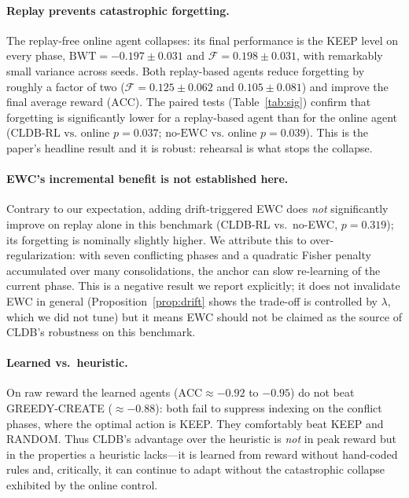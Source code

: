 \paragraph{Replay prevents catastrophic forgetting.}
The replay-free online agent collapses: its final performance is the KEEP level
on every phase, \mbox{\(\mathrm{BWT}=-0.197\pm0.031\)} and
\mbox{\(\mathcal{F}=0.198\pm0.031\)}, with remarkably small variance across seeds.
Both replay-based agents reduce forgetting by roughly a factor of two
(\(\mathcal{F}=0.125\pm0.062\) and \(0.105\pm0.081\)) and improve the final
average reward (\(\mathrm{ACC}\)). The paired tests (Table~\ref{tab:sig}) confirm
that forgetting is significantly lower for a replay-based agent than for the
online agent (\(\text{CLDB-RL vs. online } p=0.037\);
\(\text{no-EWC vs. online } p=0.039\)). This is the paper's headline result and
it is robust: rehearsal is what stops the collapse.

\paragraph{EWC's incremental benefit is not established here.}
Contrary to our expectation, adding drift-triggered EWC does \emph{not}
significantly improve on replay alone in this benchmark (CLDB-RL vs.\ no-EWC,
\(p=0.319\)); its forgetting is nominally slightly higher. We attribute this to
over-regularization: with seven conflicting phases and a quadratic Fisher
penalty accumulated over many consolidations, the anchor can slow re-learning of
the current phase. This is a negative result we report explicitly; it does not
invalidate EWC in general (Proposition~\ref{prop:drift} shows the trade-off is
controlled by \(\lambda\), which we did not tune) but it means EWC should not be
claimed as the source of CLDB's robustness on this benchmark.

\paragraph{Learned vs.\ heuristic.}
On raw reward the learned agents (\(\mathrm{ACC}\approx-0.92\) to \(-0.95\)) do not
beat GREEDY-CREATE (\(\approx-0.88\)): both fail to suppress indexing on the
conflict phases, where the optimal action is KEEP. They comfortably beat KEEP and
RANDOM. Thus CLDB's advantage over the heuristic is \emph{not} in peak reward but
in the properties a heuristic lacks---it is learned from reward without
hand-coded rules and, critically, it can continue to adapt without the
catastrophic collapse exhibited by the online control.

